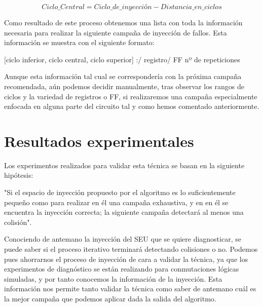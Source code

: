 \begin{equation}
    \label{eq:CicloCentral}
    Ciclo\_Central = Ciclo\_de\_inyección - Distancia\_en\_ciclos
\end{equation}

Como resultado de este proceso obtenemos una lista con toda la información
necesaria para realizar la siguiente campaña de inyección de fallos. Esta
información se muestra con el siguiente formato:
\begin{center}
    [ciclo inferior, ciclo central, ciclo superior] \hfill :/ \hfill registro/
    \hfill \gls{FF} \hfill nº de repeticiones
\end{center}

Aunque esta
información tal cual se correspondería con la próxima campaña recomendada, aún
podemos decidir manualmente, tras observar los rangos de ciclos y la variedad de
registros o \gls{FF}, si realizaremos una campaña especialmente enfocada en alguna
parte del circuito tal y como hemos comentado anteriormente.


\section{Resultados experimentales}
\label{sec:IterResults}
Los experimentos realizados para validar esta técnica se basan en la siguiente
hipótesis:

\begin{hypothesis}\label{hyp:ResIter}
    "Si el espacio de inyección propuesto por el algoritmo es lo suficientemente
    pequeño como para realizar en él una campaña exhaustiva, y en en él se
    encuentra la inyección correcta; la siguiente campaña detectará al menos una
    colisión".
\end{hypothesis}

Conociendo de antemano la inyección del \gls{SEU} que se quiere diagnosticar, se 
puede saber si el proceso iterativo terminará detectando colisiones o no.
Podemos pues ahorrarnos el proceso de inyección de cara a validar la técnica, ya
que los experimentos de diagnóstico se están realizando para conmutaciones lógicas
simuladas, y por tanto conocemos la información de la inyección. Esta información
nos permite tanto validar la técnica como saber de antemano cuál es la mejor
campaña que podemos aplicar dada la salida del algoritmo.

